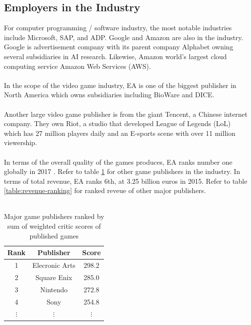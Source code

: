 \documentclass[10pt,letterpaper]{article}
\begin{document}
\subsection{Employers in the Industry}

For computer programming / software industry, the most notable industries include Microsoft, SAP, and ADP. Google and Amazon are also in the industry. Google is advertisement company with its parent company Alphabet owning several subsidiaries in AI research. Likewise, Amazon world's largest cloud computing service Amazon Web Services (AWS).\\
\\
In the scope of the video game industry, EA is one of the biggest publisher in North America which owns subsidiaries including BioWare and DICE.\\
\\
Another large video game publisher is from the giant Tencent, a Chinese internet company. They own Riot, a studio that developed League of Legends (LoL) which has 27 million players daily and an E-sports scene with over 11 million viewership.\cite{lol-wiki}\\
\\
In terms of the overall quality of the games produces, EA ranks number one globally in 2017 \cite{game-publishers-metacritic}. Refer to table \ref{table:metacritic-ranking} for other game publishers in the industry. In terms of total revenue, EA ranks 6th, at 3.25 billion euros in 2015\cite{game-publishers-revenue}. Refer to table \ref{table:revenue-ranking} for ranked reveue of other major publishers.\\
\\

\begin{table}[H]
	\centering
	\begin{tabular}{ |c|c|c| }
		\hline
		\textbf{Rank} & \textbf{Publisher} & \textbf{Score} \\
		\hline
		1             & Elecronic Arts     & 298.2          \\
		2             & Square Enix        & 285.0          \\
		3             & Nintendo           & 272.8          \\
		4             & Sony               & 254.8          \\
		$\vdots$      & $\vdots$           & $\vdots$       \\
	\end{tabular}
	\caption{Major game publishers ranked by sum of weighted critic scores of published games\cite{game-publishers-metacritic}}
	\label{table:metacritic-ranking}
\end{table}
\end{document}
